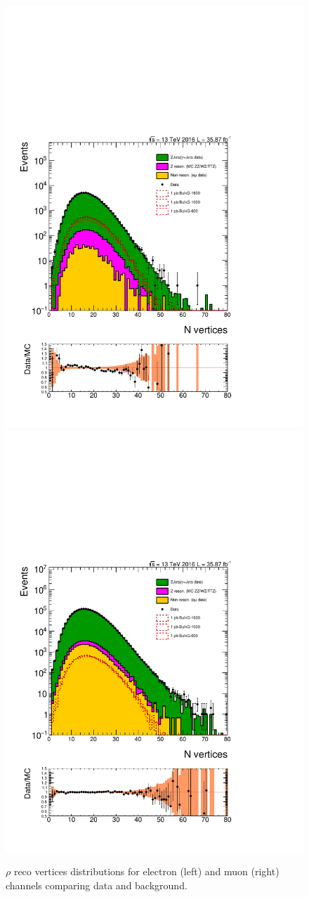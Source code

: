 \begin{figure}[htbp!]
\centering
\includegraphics[width=0.46\linewidth, page=2]{figures/ReMiniSummer16_DT_PhReMiniMCRcFixXsec_GMCPhPtWt_tightzpt50_puWeightsummer16_muoneg_gjet_metfilter_unblind_el_log_1pb.pdf}
\includegraphics[width=0.46\linewidth, page=2]{figures/ReMiniSummer16_DT_PhReMiniMCRcFixXsec_GMCPhPtWt_tightzpt50_puWeightsummer16_muoneg_gjet_metfilter_unblind_mu_log_1pb.pdf}
\caption{$\rho$ reco vertices distributions for electron (left) and muon (right)
channels comparing data and background.}
\label{fig:gjet_rho}
\end{figure}

